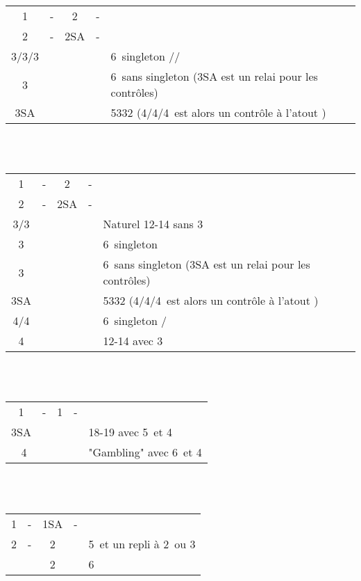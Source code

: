 \documentclass[a4paper, oneside, 11pt]{report}
\begin{document}
		\begin{tabular}{cccc|l}
		1\pique & - & 2\trefle & - &\\
		2\pique & - & 2SA & - &\\
		3\trefle/3\carreau/3\coeur &&&& 6\pique\ singleton \trefle/\carreau/\coeur\\
		3\pique &&&& 6\pique\ sans singleton (3SA est un relai pour les contrôles)\\
		3SA &&&& 5332 (4\trefle/4\carreau/4\coeur\ est alors un contrôle à l'atout \pique)\\
		\end{tabular}\\\\

		\begin{tabular}{cccc|l}
		1\pique & - & 2\coeur & - &\\
		2\pique & - & 2SA & - &\\
		3\trefle/3\carreau &&&& Naturel 12-14 sans 3\coeur\\
		3\coeur &&&& 6\pique\ singleton \coeur\\
		3\pique &&&& 6\pique\ sans singleton (3SA est un relai pour les contrôles)\\
		3SA &&&& 5332  (4\trefle/4\carreau/4\coeur\ est alors un contrôle à l'atout \pique)\\
		4\trefle/4\carreau &&&& 6\pique\ singleton \trefle/\carreau\\
		4\coeur &&&& 12-14 avec 3\coeur\\
		\end{tabular}\\\\

		\begin{tabular}{cccc|l}
		1\coeur & - & 1\pique & - &\\
		3SA &&&& 18-19 avec 5\coeur\ et 4\pique\\\
		4\pique &&&& "Gambling" avec 6\coeur\ et 4\pique\\
		\end{tabular}\\\\

		\begin{tabular}{cccc|l}
		1\pique & - & 1SA & - &\\
		2\trefle & - & 2\carreau && 5\coeur\ et un repli à 2\pique\ ou 3\trefle\\
		&& 2\coeur && 6\coeur\\
		\end{tabular}\\\\
\end{document}
